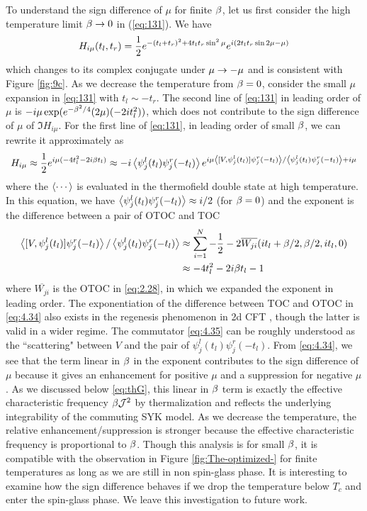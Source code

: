 \documentclass[11pt]{article}
\newcommand{\be}{\begin{equation}}
\newcommand{\ee}{\end{equation}}
\renewcommand{\>}{\rangle}
\newcommand{\<}{\langle}
\def\nn{\nonumber}
\begin{document}
To understand the sign difference of $\mu$ for finite $\beta$, let us first consider the high temperature limit $\beta\rightarrow0$ in (\ref{eq:131}). We have
\begin{equation}
H_{i\mu}(t_{l},t_{r})=\frac{1}{2}e^{-(t_{l}+t_{r})^{2}+4t_{l}t_{r}\sin^{2}\mu}e^{i(2t_{l}t_{r}\sin2\mu-\mu)}
\end{equation}
which changes to its complex conjugate under $\mu\rightarrow-\mu$ and is
consistent with Figure \ref{fig:9c}. As we decrease the temperature from $\beta = 0$, consider the small $\mu$ expansion in \eqref{eq:131} with $t_l\sim-t_r$. The second line of \eqref{eq:131} in leading order of $\mu$ is $-i\mu \exp(e^{-\beta^2/4}(2\mu)(-2i t_l^2))$, which does not contribute to the sign difference of $\mu$ of $\Im H_{i\mu}$. For the first line of \eqref{eq:131}, in leading order of small $\beta$, we can rewrite it approximately as
\be  
H_{i\mu}\app \f 1 2 e^{i\mu(-4t_l^2-2i\b t_l)}\app -i \avg{\psi^l_j(t_l)\psi^r_j(-t_l)}e^{i\mu\avg{[V,\psi^l_j(t_l)]\psi^r_j(-t_l)}/\avg{\psi^l_j(t_l)\psi^r_j(-t_l)}+i\mu} \label{eq:4.34}
\ee
where the $\left\langle \cdots\right\rangle$ is evaluated in the thermofield double state at high temperature. In this equation, we have $\left\langle \psi^l_j(t_l)\psi^r_j(-t_l)\right\rangle\approx i/2$ (for $\beta=0$) and the exponent is the difference between a pair of OTOC and TOC
\begin{align}
\avg{[V,\psi^l_j(t_l)]\psi^r_j(-t_l)}/\avg{\psi^l_j(t_l)\psi^r_j(-t_l)}&\app \sum_{i=1}^N-\f 1 2-2 \overline{W_{ji}}(it_l+\b/2,\b/2,it_l,0) \nn\\
&\app -4t_l^2-2i\b t_l-1 \label{eq:4.35}
\end{align}
where $\overline{W_{ji}}$ is the OTOC in \eqref{eq:2.28}, in which we expanded the exponent in leading order. The exponentiation of the difference between TOC and OTOC in \eqref{eq:4.34} also exists in the regenesis phenomenon in 2d CFT \cite{Gao:2018yzk}, though the latter is valid in a wider regime. The commutator \eqref{eq:4.35} can be roughly understood as the ``scattering" between $V$ and the pair of $\psi_j^l(t_l)\psi_j^r(-t_l)$. From \eqref{eq:4.34}, we see that the term linear in $\beta$  in the exponent contributes to the sign difference of $\mu$ because it gives an enhancement for positive $\mu$ and a suppression for negative $\mu$. As we discussed below \eqref{eq:thG}, this linear in $\beta$ term is exactly the effective characteristic frequency $\beta\mathcal{J}^2$ by thermalization and reflects the underlying integrability of the commuting SYK model. As we decrease the temperature, the relative enhancement/suppression is stronger because the effective characteristic frequency is proportional to $\beta$. Though this analysis is for small $\beta$, it is compatible with the observation in Figure \ref{fig:The-optimized-} for finite temperatures as long as we are still in non spin-glass phase. It is interesting to examine how the sign difference behaves if we drop the temperature below $T_c$ and enter the spin-glass phase. We leave this investigation to future work.
\end{document}
